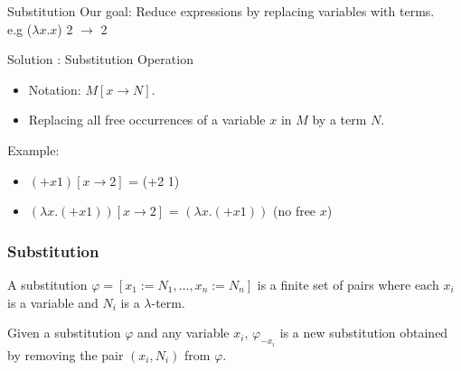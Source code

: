 \documentclass{beamer}
\begin{document}
\begin{frame}{Substitution}
  Our goal: Reduce expressions by replacing variables with terms.\\
  e.g ($\lambda x.x$) 2 $\to$ 2\\
  \vspace{1em}
  \begin{block}{}
  Solution : Substitution Operation
  \end{block}
  \begin{itemize}
    \item Notation: $M[x \to N]$.
    \item Replacing all free occurrences of a variable $x$ in $M$ by a term $N$.
  \end{itemize}
  Example:
  \begin{itemize}
    \item  $(+x1)[x\to 2]$ = (+2 1)
    \item $(\lambda x.(+x1))[x\to 2]$ = $(\lambda x.(+x1))$ (no free $x$)\\
  \end{itemize}
\end{frame}

\begin{frame}
  \frametitle{Substitution}

  \begin{definition}
    A substitution $\varphi = [x_1 := N_1, \ldots, x_n := N_n]$ is a finite set of pairs where each \(x_i\) is a variable and \(N_i\) is a $\lambda$-term.\\
  \end{definition}
  \begin{definition}
    Given a substitution \(\varphi\) and any variable \(x_i\), \(\varphi_{-x_i}\) is a new substitution obtained by removing the pair \((x_i, N_i)\) from \(\varphi\).\\
  \end{definition}

\end{frame}




\end{document}
